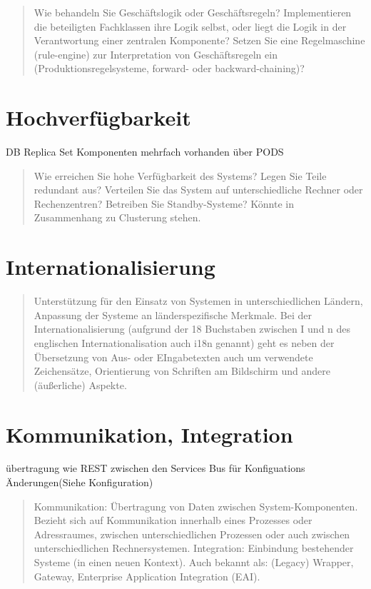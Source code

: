 \begin{quote}
	Wie behandeln Sie Geschäftslogik oder Geschäftsregeln? Implementieren die beteiligten Fachklassen ihre Logik selbst, oder liegt die Logik in der Verantwortung einer zentralen Komponente? Setzen Sie eine Regelmaschine (rule-engine) zur Interpretation von Geschäftsregeln ein (Produktionsregelsysteme, forward- oder backward-chaining)?
\end{quote}

\section{Hochverfügbarkeit}

DB Replica Set
Komponenten mehrfach vorhanden über PODS

\begin{quote}
	Wie erreichen Sie hohe Verfügbarkeit des Systems? Legen Sie Teile redundant aus? Verteilen Sie das System auf unterschiedliche Rechner oder Rechenzentren? Betreiben Sie Standby-Systeme?
	Könnte in Zusammenhang zu Clusterung stehen.
\end{quote}

\section{Internationalisierung}

\begin{quote}
	Unterstützung für den Einsatz von Systemen in unterschiedlichen Ländern, Anpassung der Systeme an länderspezifische Merkmale. Bei der Internationalisierung (aufgrund der 18 Buchstaben zwischen I und n des englischen Internationalisation auch i18n genannt) geht es neben der Übersetzung von Aus- oder EIngabetexten auch um verwendete Zeichensätze, Orientierung von Schriften am Bildschirm und andere (äußerliche) Aspekte.
\end{quote}

\section{Kommunikation, Integration}

übertragung wie REST zwischen den Services Bus für Konfiguations Änderungen(Siehe Konfiguration)

\begin{quote}
	Kommunikation: Übertragung von Daten zwischen System-Komponenten. Bezieht sich auf Kommunikation innerhalb eines Prozesses oder Adressraumes, zwischen unterschiedlichen Prozessen oder auch zwischen unterschiedlichen Rechnersystemen.
	Integration: Einbindung bestehender Systeme (in einen neuen Kontext). Auch bekannt als: (Legacy) Wrapper, Gateway, Enterprise Application Integration (EAI).
\end{quote}

